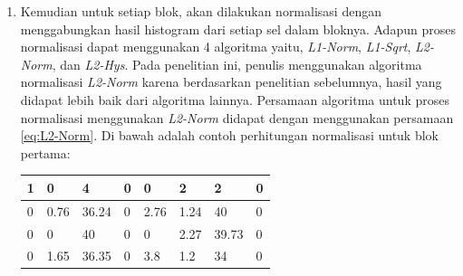 \begin{enumerate}
\begin{adjustbox}{width=1\textwidth}
\begin{minipage}{\linewidth}
		\label{fig:HasilHOG}
	\end{minipage}
\end{adjustbox}
\item Kemudian untuk setiap blok, akan dilakukan normalisasi dengan menggabungkan hasil histogram dari setiap sel dalam bloknya. Adapun proses normalisasi dapat menggunakan 4 algoritma yaitu, \textit{L1-Norm}, \textit{L1-Sqrt}, \textit{L2-Norm}, dan \textit{L2-Hys}. Pada penelitian ini, penulis menggunakan algoritma normalisasi \textit{L2-Norm} karena berdasarkan penelitian sebelumnya, hasil yang didapat lebih baik dari algoritma lainnya. Persamaan algoritma untuk proses normalisasi menggunakan \textit{L2-Norm} didapat dengan menggunakan persamaan \ref{eq:L2-Norm}. Di bawah adalah contoh perhitungan normalisasi untuk blok pertama:
\begin{table}[H]
	\centering
	\begin{small}
		\begin{tabular}{|p{1cm}|p{1cm}|p{1cm}|p{1cm}|p{1cm}|p{1cm}|p{1cm}|p{1cm}|}
			\hline
			1 & 0 & 4 & 0 & 0 & 2 & 2 & 0 \\
			\hline
			0 & 0.76 & 36.24 & 0 & 2.76 & 1.24 & 40 & 0 \\
			\hline
			0 & 0 & 40 & 0 & 0 & 2.27 & 39.73 & 0 \\
			\hline
			0 & 1.65 & 36.35 & 0 & 3.8 & 1.2 & 34 & 0 \\
			\hline
		\end{tabular}
	\end{small}
	\label{fig:MatriksHasilPerhitunganHistogram}

\end{table}
\end{enumerate}
